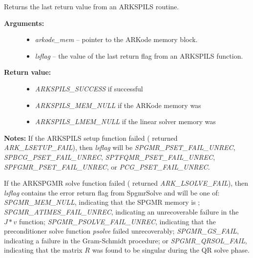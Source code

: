\documentclass[letterpaper,10pt,english]{sphinxmanual}
\begin{document}
\begin{fulllineitems}
\label{c_interface/User_callable:ARKSpilsGetLastFlag}
Returns the last return value from an ARKSPILS routine.
\begin{description}
\item[{\textbf{Arguments:}}] \leavevmode\begin{itemize}
\item {} 
\emph{arkode\_mem} -- pointer to the ARKode memory block.

\item {} 
\emph{lsflag} -- the value of the last return flag from an
ARKSPILS function.

\end{itemize}

\item[{\textbf{Return value:}}] \leavevmode\begin{itemize}
\item {} 
\emph{ARKSPILS\_SUCCESS} if successful

\item {} 
\emph{ARKSPILS\_MEM\_NULL} if the ARKode memory was 

\item {} 
\emph{ARKSPILS\_LMEM\_NULL} if the linear solver memory was 

\end{itemize}

\end{description}

\textbf{Notes:} If the ARKSPILS setup function failed ({\hyperref[c_interface/User_callable:ARKode]{}}
returned \emph{ARK\_LSETUP\_FAIL}), then \emph{lsflag} will be
\emph{SPGMR\_PSET\_FAIL\_UNREC}, \emph{SPBCG\_PSET\_FAIL\_UNREC},
\emph{SPTFQMR\_PSET\_FAIL\_UNREC}, \emph{SPFGMR\_PSET\_FAIL\_UNREC}, or
\emph{PCG\_PSET\_FAIL\_UNREC}.

If the ARKSPGMR solve function failed ({\hyperref[c_interface/User_callable:ARKode]{}}
returned \emph{ARK\_LSOLVE\_FAIL}), then \emph{lsflag} contains the error
return flag from SpgmrSolve and will be one of:
\emph{SPGMR\_MEM\_NULL}, indicating that the SPGMR memory is
; \emph{SPGMR\_ATIMES\_FAIL\_UNREC}, indicating an unrecoverable
failure in the $J*v$ function; \emph{SPGMR\_PSOLVE\_FAIL\_UNREC},
indicating that the preconditioner solve function \emph{psolve} failed
unrecoverably; \emph{SPGMR\_GS\_FAIL}, indicating a failure in the
Gram-Schmidt procedure; or \emph{SPGMR\_QRSOL\_FAIL}, indicating that
the matrix $R$ was found to be singular during the QR solve
phase.


\end{fulllineitems}
\end{document}
